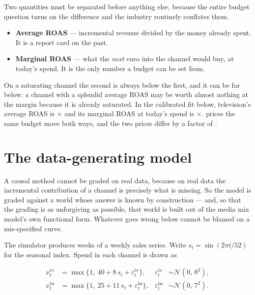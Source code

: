 Two quantities must be separated before anything else, because the entire budget question turns on
the difference and the industry routinely conflates them.

\begin{itemize}[leftmargin=*]
  \item \textbf{Average ROAS} --- incremental revenue divided by the money already spent. It is a
        report card on the past.
  \item \textbf{Marginal ROAS} --- what the \emph{next} euro into the channel would buy, at
        today's spend. It is the only number a budget can be set from.
\end{itemize}

On a saturating channel the second is always below the first, and it can be far below: a channel
with a splendid average ROAS may be worth almost nothing at the margin because it is already
saturated. In the calibrated fit below, television's average ROAS is \nbSixAvgRoasTv$\times$ and its
marginal ROAS at today's spend is \nbSixMargRoasTv$\times$.  prices the same
budget move both ways, and the two prices differ by a factor of \nbSixAvgOverSat{}.

\section{The data-generating model}
\label{sec:mmm:dgm}

A causal method cannot be graded on real data, because on real data the incremental contribution
of a channel is precisely what is missing. So the model is graded against a world whose answer is
known by construction --- and, so that the grading is as unforgiving as possible, that world is
built out of the media mix model's own functional form. Whatever goes wrong below cannot be blamed
on a mis-specified curve.

The simulator produces \nbSixNWeeks{} weeks of a weekly sales series. Write
$s_t = \sin(2\pi t / 52)$ for the seasonal index. Spend in each channel is drawn as

\begin{align}
  x^{\text{tv}}_t
    &= \max\big\{1,\ 40 + 8\,s_t + \varepsilon^{\text{tv}}_t\big\},
       &\varepsilon^{\text{tv}}_t &\sim \mathcal N(0,\, 8^2), \label{eq:mmm:xtv}\\
  x^{\text{bs}}_t
    &= \max\big\{1,\ 25 + 11\,s_t + \varepsilon^{\text{bs}}_t\big\},
       &\varepsilon^{\text{bs}}_t &\sim \mathcal N(0,\, 7^2). \label{eq:mmm:xbs}
\end{align}

